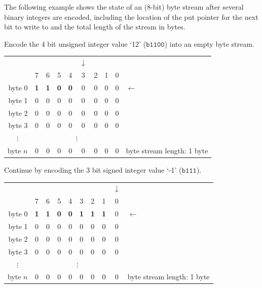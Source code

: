 \documentclass[9pt,letterpaper]{book}
\newcommand{\bin}[1]{\ensuremath{\mathtt{b#1}}}
\numberwithin{equation}{chapter}
\numberwithin{figure}{chapter}
\numberwithin{table}{chapter}
\begin{document}
The following example shows the state of an (8-bit) byte stream after several
 binary integers are encoded, including the location of the put pointer for the
 next bit to write to and the total length of the stream in bytes.

Encode the 4 bit unsigned integer value `12' (\bin{1100}) into an empty byte
 stream.

\begin{tabular}{r|ccccccccl}
\multicolumn{1}{r}{}& &&&&$\downarrow$&&&& \\
         & 7 & 6 & 5 & 4 & 3 & 2 & 1 & 0 & \\\cline{1-9}
byte 0   & \textbf{1} & \textbf{1} & \textbf{0} & \textbf{0} &
                           0 & 0 & 0 & 0 & $\leftarrow$     \\
byte 1   & 0 & 0 & 0 & 0 & 0 & 0 & 0 & 0 &                  \\
byte 2   & 0 & 0 & 0 & 0 & 0 & 0 & 0 & 0 &                  \\
byte 3   & 0 & 0 & 0 & 0 & 0 & 0 & 0 & 0 &                  \\
\multicolumn{1}{c|}{$\vdots$}&\multicolumn{8}{c}{$\vdots$}& \\
byte $n$ & 0 & 0 & 0 & 0 & 0 & 0 & 0 & 0 &
byte stream length: 1 byte
\end{tabular}
\vspace{\baselineskip}

Continue by encoding the 3 bit signed integer value `-1' (\bin{111}).

\begin{tabular}{r|ccccccccl}
\multicolumn{1}{r}{} &&&&&&&&$\downarrow$& \\
         & 7 & 6 & 5 & 4 & 3 & 2 & 1 & 0 & \\\cline{1-9}
byte 0   & \textbf{1} & \textbf{1} & \textbf{0} & \textbf{0} &
           \textbf{1} & \textbf{1} & \textbf{1} & 0 & $\leftarrow$ \\
byte 1   & 0 & 0 & 0 & 0 & 0 & 0 & 0 & 0 &                         \\
byte 2   & 0 & 0 & 0 & 0 & 0 & 0 & 0 & 0 &                         \\
byte 3   & 0 & 0 & 0 & 0 & 0 & 0 & 0 & 0 &                         \\
\multicolumn{1}{c|}{$\vdots$}&\multicolumn{8}{c}{$\vdots$}&        \\
byte $n$ & 0 & 0 & 0 & 0 & 0 & 0 & 0 & 0 &
byte stream length: 1 byte
\end{tabular}
\vspace{\baselineskip}
\end{document}
